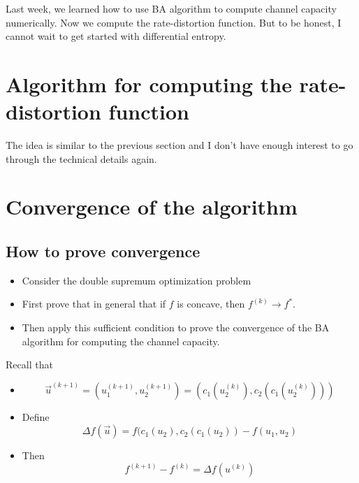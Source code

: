 \documentclass[../main.tex]{subfiles}
\begin{document}
Last week, we learned how to use BA algorithm to compute channel capacity numerically. Now we compute the rate-distortion function. But to be honest, I cannot wait to get started with differential entropy.
\section{Algorithm for computing the rate-distortion function}
The idea is similar to the previous section and I don't have enough interest to go through the technical details again.
\section{Convergence of the algorithm}
\subsection{How to prove convergence}
\begin{itemize}
    \item Consider the double supremum optimization problem
    \item First prove that in general that if $f$ is concave, then $f^{(k)}\to f^*$.
    \item Then apply this sufficient condition to prove the convergence of the BA algorithm for computing the channel capacity.
\end{itemize}
Recall that
\begin{itemize}
    \item \[
    \vec u^{(k+1)} = (u_1^{(k+1)}, u_2^{(k+1)})=(c_1(u_2^{(k)}), c_2(c_1(u_2^{(k)})))
    \]
    \item Define \[
    \Delta f(\vec u) = f(c_1(u_2), c_2(c_1(u_2)) - f(u_1,u_2)
    \]
    \item Then \[
    f^{(k+1)}-f^{(k)}=\Delta f(u^{(k)})
    \]
\end{itemize}
\end{document}
